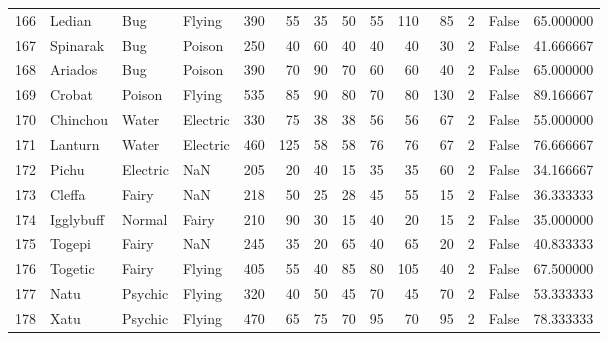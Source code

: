 \begin{tabular}{rlllrrrrrrrrlr}
 166 &                     Ledian &       Bug &    Flying &    390 &   55 &      35 &       50 &       55 &      110 &     85 &           2 &      False &   65.000000 \\
 167 &                   Spinarak &       Bug &    Poison &    250 &   40 &      60 &       40 &       40 &       40 &     30 &           2 &      False &   41.666667 \\
 168 &                    Ariados &       Bug &    Poison &    390 &   70 &      90 &       70 &       60 &       60 &     40 &           2 &      False &   65.000000 \\
 169 &                     Crobat &    Poison &    Flying &    535 &   85 &      90 &       80 &       70 &       80 &    130 &           2 &      False &   89.166667 \\
 170 &                   Chinchou &     Water &  Electric &    330 &   75 &      38 &       38 &       56 &       56 &     67 &           2 &      False &   55.000000 \\
 171 &                    Lanturn &     Water &  Electric &    460 &  125 &      58 &       58 &       76 &       76 &     67 &           2 &      False &   76.666667 \\
 172 &                      Pichu &  Electric &       NaN &    205 &   20 &      40 &       15 &       35 &       35 &     60 &           2 &      False &   34.166667 \\
 173 &                     Cleffa &     Fairy &       NaN &    218 &   50 &      25 &       28 &       45 &       55 &     15 &           2 &      False &   36.333333 \\
 174 &                  Igglybuff &    Normal &     Fairy &    210 &   90 &      30 &       15 &       40 &       20 &     15 &           2 &      False &   35.000000 \\
 175 &                     Togepi &     Fairy &       NaN &    245 &   35 &      20 &       65 &       40 &       65 &     20 &           2 &      False &   40.833333 \\
 176 &                    Togetic &     Fairy &    Flying &    405 &   55 &      40 &       85 &       80 &      105 &     40 &           2 &      False &   67.500000 \\
 177 &                       Natu &   Psychic &    Flying &    320 &   40 &      50 &       45 &       70 &       45 &     70 &           2 &      False &   53.333333 \\
 178 &                       Xatu &   Psychic &    Flying &    470 &   65 &      75 &       70 &       95 &       70 &     95 &           2 &      False &   78.333333 \\

\end{tabular}
